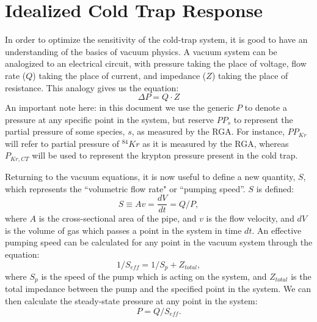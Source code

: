 \section{Idealized Cold Trap Response}
\label{sec:vaceq}
In order to optimize the sensitivity of the cold-trap system, it is good to have an understanding of the basics of vacuum physics. A vacuum system can be analogized to an electrical circuit, with pressure taking the place of voltage, flow rate ($Q$) taking the place of current, and impedance ($Z$) taking the place of resistance. This analogy gives us the equation:
\begin{equation}
\label{eq:vaclaw1}
\Delta P = Q\cdot Z
\end{equation} 
An important note here: in this document we use the generic $P$ to denote a pressure at any specific point in the system, but reserve $PP_{s}$ to represent the partial pressure of some species, $s$, as measured by the RGA. For instance, $PP_{Kr}$ will refer to partial pressure of $^{84}Kr$ as it is measured by the RGA, whereas $P_{Kr,CT}$ will be used to represent the krypton pressure present in the cold trap. 

Returning to the vacuum equations, it is now useful to define a new quantity, $S$, which represents the ``volumetric flow rate" or ``pumping speed''. $S$ is defined: 
\begin{equation}
\label{eq:volflow}
S \equiv Av = \frac{dV}{dt}=Q/P, 
\end{equation}
where $A$ is the cross-sectional area of the pipe, and $v$ is the flow velocity, and $dV$ is the volume of gas which passes a point in the system in time $dt$. An effective pumping speed can be calculated for any point in the vacuum system through the equation:
\begin{equation}
\label{ep:vacimp}
1/S_{eff} = 1/S_{p}+Z_{total}, 
\end{equation}
where $S_{p}$ is the speed of the pump which is acting on the system, and $Z_{total}$ is the total impedance between the pump and the specified point in the system. We can then calculate the steady-state pressure at any point in the system\cite{vac_eq}:
\begin{equation}
\label{eq:vaclaw2}
P=Q/S_{eff}.
\end{equation}


